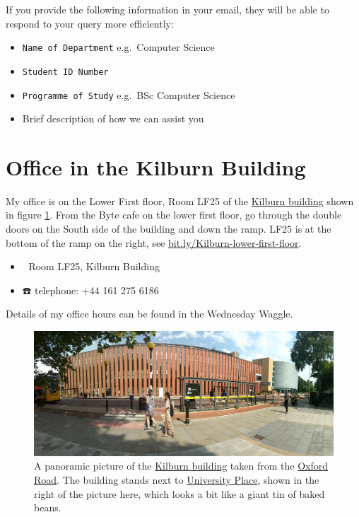 \documentclass[
  12pt,
]{book}
\providecommand{\tightlist}{%
  \setlength{\itemsep}{0pt}\setlength{\parskip}{0pt}}
\begin{document}
If you provide the following information in your email, they will be able to respond to your query more efficiently:

\begin{itemize}
\tightlist
\item
  \texttt{Name\ of\ Department} e.g.~Computer Science
\item
  \texttt{Student\ ID\ Number}
\item
  \texttt{Programme\ of\ Study} e.g.~BSc Computer Science
\item
  Brief description of how we can assist you
\end{itemize}

\hypertarget{office}{%
\section{Office in the Kilburn Building}\label{office}}

My office is on the Lower First floor, Room LF25 of the \href{https://en.wikipedia.org/wiki/Kilburn_Building}{Kilburn building} shown in figure \ref{fig:kilburn-fig}. From the Byte cafe on the lower first floor, go through the double doors on the South side of the building and down the ramp. LF25 is at the bottom of the ramp on the right, see \href{https://bit.ly/Kilburn-lower-first-floor}{bit.ly/Kilburn-lower-first-floor}.

\begin{itemize}
\tightlist
\item
  🏢 Room LF25, Kilburn Building
\item
  ☎️ telephone: +44 161 275 6186
\end{itemize}

Details of my office hours can be found in the Wednesday Waggle. 🐝

\begin{figure}

{\centering \includegraphics[width=1\linewidth]{images/kilburnarama} 

}

\caption{A panoramic picture of the \href{https://en.wikipedia.org/wiki/Kilburn_Building}{Kilburn building} taken from the \href{https://en.wikipedia.org/wiki/Wilmslow_Road}{Oxford Road}. The building stands next to \href{https://www.conference.manchester.ac.uk/venues/search/details/?property=10}{University Place}, shown in the right of the picture here, which looks a bit like a giant tin of baked beans.}\label{fig:kilburn-fig}
\end{figure}
\end{document}
